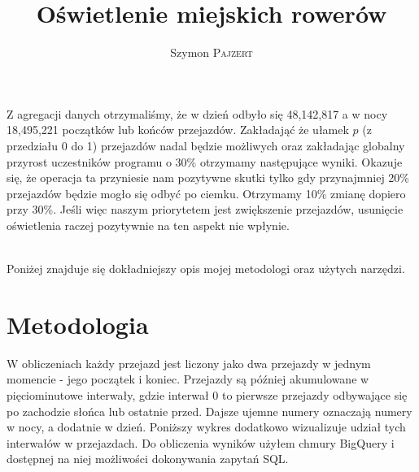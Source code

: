 \documentclass{article}
\title{ Oświetlenie miejskich rowerów } %
\author{Szymon \textsc{Pajzert}} %
\date{}
\begin{document}
\maketitle %



Z agregacji danych otrzymaliśmy, że w dzień odbyło się 48,142,817 a w nocy 18,495,221 początków lub końców przejazdów. Zakładająć że ułamek $p$ (z przedziału 0 do 1) przejazdów nadal będzie możliwych oraz zakładając globalny przyrost uczestników programu o 30\% otrzymamy następujące wyniki. Okazuje się, że operacja ta przyniesie nam pozytywne skutki tylko gdy przynajmniej 20\% przejazdów będzie mogło się odbyć po ciemku. Otrzymamy 10\% zmianę dopiero przy 30\%. Jeśli więc naszym priorytetem jest zwiększenie przejazdów, usunięcie oświetlenia raczej pozytywnie na ten aspekt nie wpłynie. \\ 

 \\

Poniżej znajduje się dokładniejszy opis mojej metodologi oraz użytych narzędzi.

\newpage
\section*{Metodologia}

W obliczeniach każdy przejazd jest liczony jako dwa przejazdy w jednym momencie - jego początek i koniec. Przejazdy są później akumulowane w pięciominutowe interwały, gdzie interwał 0 to pierwsze przejazdy odbywające się po zachodzie słońca lub ostatnie przed. Dajsze ujemne numery oznaczają numery w nocy, a dodatnie w dzień. Poniższy wykres dodatkowo wizualizuje udział tych interwałów w przejazdach. Do obliczenia wyników użyłem chmury BigQuery i dostępnej na niej możliwości dokonywania zapytań SQL. \\
\end{document}
